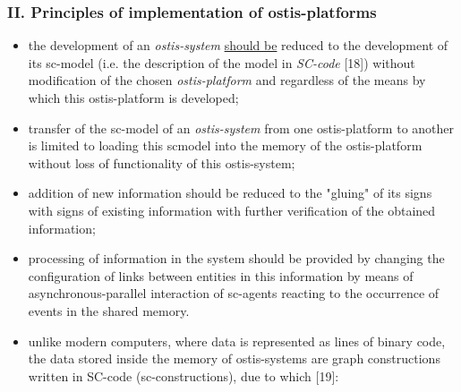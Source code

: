 \documentclass{article}
\begin{document}
\begin{multicols}{2}
\begin{center}
    \subsubsection*{\textmd{\normalsize{II. Principles of implementation of ostis-platforms}}}
\end{center}
\par
{}\par
\begin{itemize}
\item the development of an \textit{ostis-system} \underline{should be} reduced to the development of its sc-model (i.e. the
description of the model in \textit{SC-code} [18]) without
modification of the chosen \textit{ostis-platform} and regardless of the means by which this ostis-platform is
developed;
\item transfer of the sc-model of an \textit{ostis-system} from one
ostis-platform to another is limited to loading this scmodel into the memory of the ostis-platform without
loss of functionality of this ostis-system;
\item addition of new information should be reduced to
the "gluing" of its signs with signs of existing
information with further verification of the obtained
information;
\item processing of information in the system should be
provided by changing the configuration of links
between entities in this information by means of
asynchronous-parallel interaction of sc-agents reacting to the occurrence of events in the shared
memory.


\end{itemize}
\par
\begin{itemize}
\item  unlike modern computers, where data is represented
as lines of binary code, the data stored inside the
memory of ostis-systems are graph constructions
written in SC-code (sc-constructions), due to which
[19]:



\end{itemize}
\end{multicols}
\end{document}
